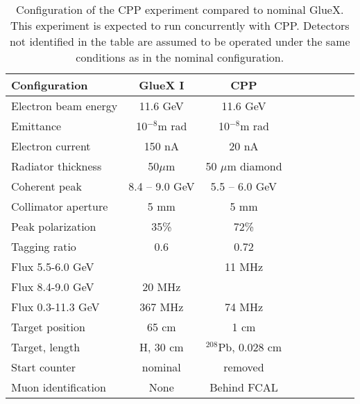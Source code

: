 \begin{table}[t]
\caption{Configuration of the CPP experiment compared to nominal GlueX. This experiment is expected to run concurrently with CPP. Detectors not identified
in the table are assumed to be operated under the same conditions as in the nominal configuration.
\label{tab:ccp_config}
}
\begin{center}
\begin{tabular}{|l|c|c|c|c|c|c|c|c|}
\hline
\hline 
  Configuration  & GlueX I  & CPP   \\  \hline \hline
  Electron  beam energy  &   11.6 GeV   &  11.6 GeV   \\ \hline 
  Emittance   &   10$^{-8}$m rad   &  10$^{-8}$m rad   \\ \hline 
  Electron  current  &   150 nA   &  20 nA  \\ \hline
  Radiator thickness  &   50$\mu$m  &  50 $\mu$m diamond   \\ \hline 
  Coherent peak  &   8.4 -- 9.0 GeV   &  5.5 -- 6.0 GeV     \\ \hline 
  Collimator aperture  &  5 mm & 5 mm   \\ \hline  
  Peak polarization  &   35\%   &  72\%     \\ \hline 
  Tagging ratio  &   0.6   &   0.72 \\ \hline  
  Flux 5.5-6.0 GeV  &      &   11 MHz \\ \hline   
  Flux 8.4-9.0 GeV  &  20 MHz    &    \\ \hline  
  Flux 0.3-11.3 GeV  &  367 MHz    &   74 MHz \\ \hline 
  Target position  &   65 cm   &  1 cm    \\ \hline 
  Target, length   &  H, 30 cm   &  $^{208}$Pb, 0.028 cm   \\
 \hline  
  Start counter & nominal & removed \\ \hline
  Muon identification  &  None   &   Behind FCAL    \\ \hline   
  \hline
\end{tabular}
\end{center}
\end{table}
